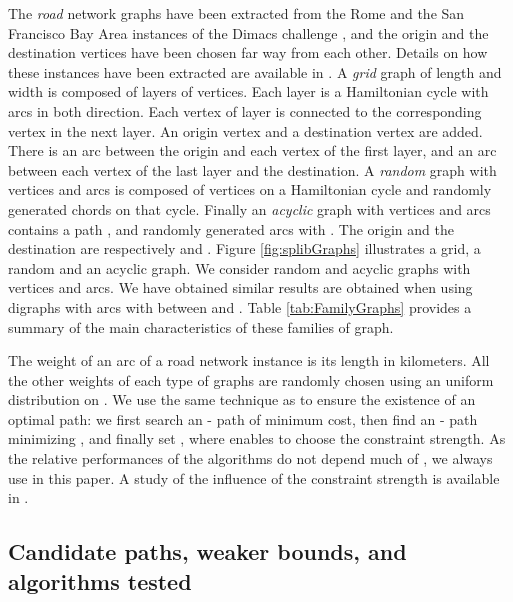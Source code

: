\documentclass[11pt]{amsart}
\theoremstyle{plain}
\theoremstyle{remark}
\begin{document}
The \emph{road} network graphs have been extracted from the Rome and the San Francisco Bay Area instances of the Dimacs challenge \cite{dimacsChallenge}, and the origin and the destination vertices have been chosen far way from each other. Details on how these instances have been extracted are available in \cite{parmentier2016thesis}. A \emph{grid} graph of length  and width  is composed of  layers of  vertices. Each layer  is a Hamiltonian cycle  with arcs in both direction. Each vertex  of layer  is connected to the corresponding vertex  in the next layer. An origin vertex  and a destination vertex  are added. There is an arc between the origin  and each vertex of the first layer, and an arc between each vertex of the last layer and the destination. A \emph{random} graph with  vertices and  arcs is composed of  vertices on a Hamiltonian cycle and randomly generated chords on that cycle. Finally an \emph{acyclic} graph with  vertices and  arcs contains a path , and randomly generated arcs  with . The origin and the destination are respectively  and . Figure \ref{fig:splibGraphs} illustrates a grid, a random and an acyclic graph. We consider random and acyclic graphs with  vertices and  arcs. We have obtained similar results are obtained when using digraphs with  arcs with  between  and  \cite{parmentier2016thesis}. Table \ref{tab:FamilyGraphs} provides a summary of the main characteristics of these families of graph.

The weight  of an arc  of a road network instance is its length in kilometers. All the other weights  of each type of graphs are randomly chosen using an uniform distribution on . We use the same technique as \cite{dumitrescu2003improved} to ensure the existence of an optimal path: we first search an - path  of minimum cost, then find an - path  minimizing , and finally set , where  enables to choose the constraint strength. As the relative performances of the algorithms do not depend much of , we always use  in this paper. A study of the influence of the constraint strength  is available in \cite{parmentier2016thesis}.



















\subsection{Candidate paths, weaker bounds, and algorithms tested} \label{sub:candidate_paths}
 
\end{document}
